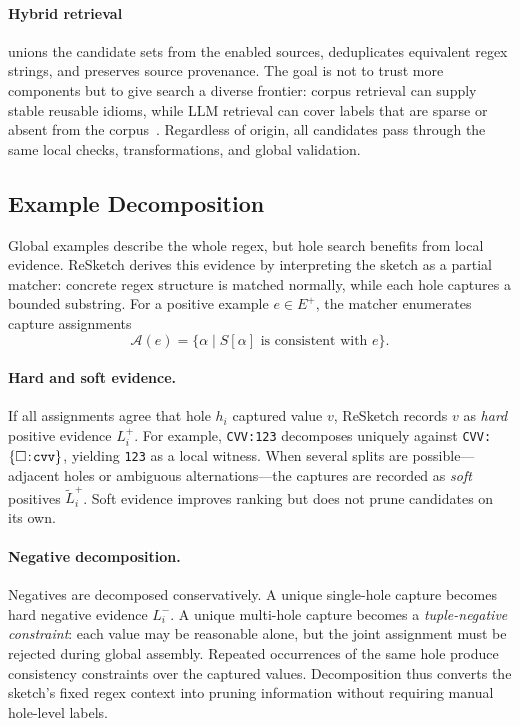 \documentclass[sigconf,nonacm]{acmart}
\newcommand{\hole}[1]{\ensuremath{\{\square\!:\!\text{\texttt{#1}}\}}}
\begin{document}
\paragraph{Hybrid retrieval} unions the candidate sets from the enabled
sources, deduplicates equivalent regex strings, and preserves source
provenance. The goal is not to trust more components but to give search a
diverse frontier: corpus retrieval can supply stable reusable idioms, while LLM
retrieval can cover labels that are sparse or absent from the
corpus~\cite{cakar2025reuse}. Regardless of origin, all candidates pass
through the same local checks, transformations, and global validation.

\subsection{Example Decomposition}
Global examples describe the whole regex, but hole search benefits from local
evidence. ReSketch derives this evidence by interpreting the sketch as a partial
matcher: concrete regex structure is matched normally, while each hole captures
a bounded substring. For a positive example \(e \in E^+\), the matcher
enumerates capture assignments
\[
  \mathcal{A}(e) = \{\alpha \mid S[\alpha]\text{ is consistent with }e\}.
\]

\paragraph{Hard and soft evidence.}
If all assignments agree that hole \(h_i\) captured value \(v\), ReSketch
records \(v\) as \emph{hard} positive evidence \(L_i^+\). For example,
\texttt{CVV:123} decomposes uniquely against \texttt{CVV:}\hole{cvv}, yielding
\texttt{123} as a local witness. When several splits are possible---adjacent
holes or ambiguous alternations---the captures are recorded as \emph{soft}
positives \(\widetilde{L}_i^+\). Soft evidence improves ranking but does not
prune candidates on its own.

\paragraph{Negative decomposition.}
Negatives are decomposed conservatively. A unique single-hole capture becomes
hard negative evidence \(L_i^-\). A unique multi-hole capture becomes a
\emph{tuple-negative constraint}: each value may be reasonable alone, but the
joint assignment must be rejected during global assembly. Repeated occurrences
of the same hole produce consistency constraints over the captured values.
Decomposition thus converts the sketch's fixed regex context into pruning
information without requiring manual hole-level labels.
\end{document}
